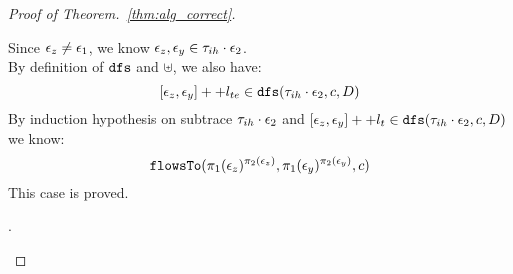 \begin{proof}[Proof of Theorem.~\ref{thm:alg_correct}]
\begin{case}
\begin{subcase}
\begin{subsubcase}[$\event_z \eventneq \event_1$]
%

%
Since $\mathtt{\epsilon}_z \neq \mathtt{\epsilon}_1$, we know $\mathtt{\epsilon}_z, \mathtt{\epsilon}_y \in \mathtt{\tau}_{ih} \cdot \mathtt{\epsilon}_2$.
\\
By definition of $\mathtt{dfs}$ and $\uplus$,  we also have:
\[
  [\mathtt{\epsilon}_z, \mathtt{\epsilon}_y] ++ l_{te} \in \mathtt{dfs}(\mathtt{\tau}_{ih} \cdot \mathtt{\epsilon}_2, c, D) 
\]
%
%
%
By induction hypothesis on subtrace $\mathtt{\tau}_{ih} \cdot \mathtt{\epsilon}_2$ and $[\mathtt{\epsilon}_z, \mathtt{\epsilon}_y] ++ l_t 
  \in \mathtt{dfs}(\mathtt{\tau}_{ih} \cdot \mathtt{\epsilon}_2, c, D)$ we know:
\[
  \mathtt{flowsTo}(\pi_1(\mathtt{\epsilon}_z)^{\pi_2(\mathtt{\epsilon}_z)}, \pi_1(\mathtt{\epsilon}_y)^{\pi_2(\mathtt{\epsilon}_y)}, c)
\]
This case is proved.
%
\end{subsubcase}
%
\begin{subsubcase}.
\\

\end{subsubcase}
\end{subcase}
\end{case}
\end{proof}
